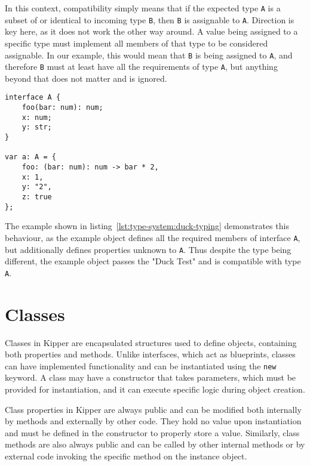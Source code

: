 In this context, compatibility simply means that if the expected type \lstinline|A| is a subset of or identical to incoming type \lstinline|B|, then \lstinline|B| is assignable to \lstinline|A|. Direction is key here, as it does not work the other way around. A value being assigned to a specific type must implement all members of that type to be considered assignable. In our example, this would mean that \lstinline|B| is being assigned to \lstinline|A|, and therefore \lstinline|B| must at least have all the requirements of type \lstinline|A|, but anything beyond that does not matter and is ignored.

\begin{lstlisting}[language=Kipper,caption=Demonstration of duck typing within Kipper,label=lst:type-system:duck-typing]
interface A {
	foo(bar: num): num;
	x: num;
	y: str;
}

var a: A = {
	foo: (bar: num): num -> bar * 2,
	x: 1,
	y: "2",
	z: true
};
\end{lstlisting}

The example shown in listing~\ref{lst:type-system:duck-typing} demonstrates this behaviour, as the example object defines all the required members of interface \lstinline|A|, but additionally defines properties unknown to \lstinline|A|. Thus despite the type being different, the example object passes the "Duck Test" and is compatible with type \lstinline|A|.

\section{Classes}
\label{sec:kipper-classes}

Classes in Kipper are encapsulated structures used to define objects, containing both properties and methods. Unlike interfaces, which act as blueprints, classes can have implemented functionality and can be instantiated using the \lstinline|new| keyword. A class may have a constructor that takes parameters, which must be provided for instantiation, and it can execute specific logic during object creation.

Class properties in Kipper are always public and can be modified both internally by methods and externally by other code. They hold no value upon instantiation and must be defined in the constructor to properly store a value. Similarly, class methods are also always public and can be called by other internal methods or by external code invoking the specific method on the instance object.

